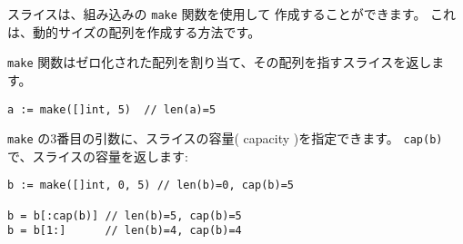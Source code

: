 スライスは、組み込みの \texttt{make} 関数を使用して
作成することができます。 これは、動的サイズの配列を作成する方法です。

\texttt{make} 関数はゼロ化された配列を割り当て、その配列を指すスライスを返します。

\begin{lstlisting}[numbers=none]
a := make([]int, 5)  // len(a)=5
\end{lstlisting}

\texttt{make} の3番目の引数に、スライスの容量( capacity )を指定できます。
\texttt{cap(b)} で、スライスの容量を返します:

\begin{lstlisting}[numbers=none]
b := make([]int, 0, 5) // len(b)=0, cap(b)=5

b = b[:cap(b)] // len(b)=5, cap(b)=5
b = b[1:]      // len(b)=4, cap(b)=4
\end{lstlisting}